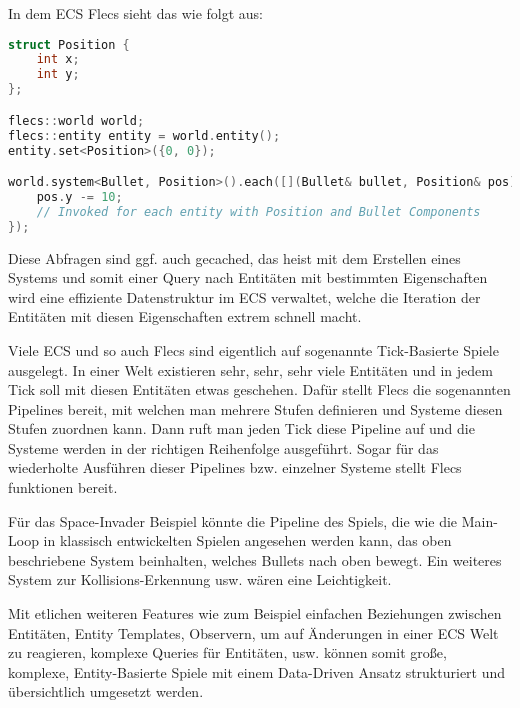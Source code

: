 \documentclass{article}
\begin{document}
    In dem ECS Flecs sieht das wie folgt aus:
    \begin{lstlisting}[language=C++]
struct Position {
    int x;
    int y;
};

flecs::world world;
flecs::entity entity = world.entity();
entity.set<Position>({0, 0});

world.system<Bullet, Position>().each([](Bullet& bullet, Position& pos) {
    pos.y -= 10;
    // Invoked for each entity with Position and Bullet Components
});
    \end{lstlisting}

    Diese Abfragen sind ggf. auch gecached, das heist mit dem Erstellen eines Systems und somit einer Query nach Entitäten
    mit bestimmten Eigenschaften wird eine effiziente Datenstruktur im ECS verwaltet, welche die Iteration der Entitäten
    mit diesen Eigenschaften extrem schnell macht.

    Viele ECS und so auch Flecs sind eigentlich auf sogenannte Tick-Basierte Spiele ausgelegt.
    In einer Welt existieren sehr, sehr, sehr viele Entitäten und in jedem Tick soll mit diesen Entitäten etwas geschehen.
    Dafür stellt Flecs die sogenannten Pipelines bereit, mit welchen man mehrere Stufen definieren und Systeme diesen Stufen zuordnen kann.
    Dann ruft man jeden Tick diese Pipeline auf und die Systeme werden in der richtigen Reihenfolge ausgeführt.
    Sogar für das wiederholte Ausführen dieser Pipelines bzw. einzelner Systeme stellt Flecs funktionen bereit.

    Für das Space-Invader Beispiel könnte die Pipeline des Spiels, die wie die Main-Loop in klassisch entwickelten Spielen
    angesehen werden kann, das oben beschriebene System beinhalten, welches Bullets nach oben bewegt.
    Ein weiteres System zur Kollisions-Erkennung usw. wären eine Leichtigkeit.

    Mit etlichen weiteren Features wie zum Beispiel einfachen Beziehungen zwischen Entitäten, Entity Templates,
    Observern, um auf Änderungen in einer ECS Welt zu reagieren, komplexe Queries für Entitäten, usw. können somit
    große, komplexe, Entity-Basierte Spiele mit einem Data-Driven Ansatz strukturiert und übersichtlich umgesetzt werden.
    
\end{document}
